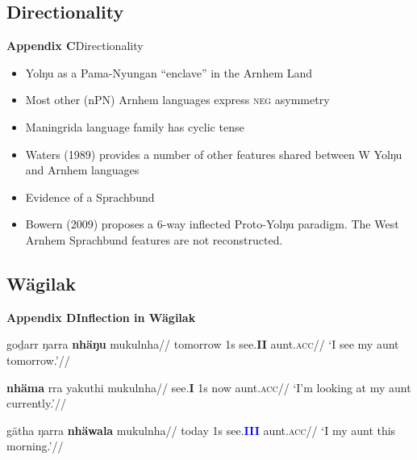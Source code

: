 \documentclass[dvipsnames]{beamer}%
\newcommand{\I}{\textbf{\textcolor{forest}{I}}}
\newcommand{\II}{\textbf{\textcolor{ochre}{II}}}
\newcommand{\III}{\textbf{\textcolor{blue}{III}}}
\begin{document}
%		
%		
%		
%		

\subsection*{Directionality}
\begin{frame}{\textbf{Appendix C}\hfill Directionality}
\begin{itemize}
	\item Yolŋu as a Pama-Nyungan ``enclave'' in the Arnhem Land
	\item Most other (nPN) Arnhem languages express \textsc{neg} asymmetry
	\item Maningrida language family has cyclic tense
	\item Waters (1989) provides a number of other features shared between W Yolŋu and Arnhem languages
	\item Evidence of a Sprachbund
	\item Bowern (2009) proposes a 6-way inflected Proto-Yolŋu paradigm. The West Arnhem Sprachbund features are not reconstructed.\end{itemize}
\end{frame}





\subsection*{Wägilak}

\begin{frame}{\textbf{Appendix D\hfill Inflection in Wägilak}}
	
	\ex\begingl\gla {}goḏarr ŋarra \textbf<1>{nhäŋu} mukulnha//
	\glb tomorrow 1s see.\II{} aunt.\textsc{acc}//
	\glft`I  see my aunt tomorrow.'//\endgl\xe
	
	\ex\begingl\gla {}\textbf<1>{nhäma} rra yakuthi mukulnha//
	\glb see.\textbf{{\I}} 1s now aunt.\textsc{acc}//
	\glft`I'm  looking at my aunt currently.'//\endgl\xe
	
	
	\ex\begingl\gla {}gätha ŋarra \textbf<1>{nhäwala} mukulnha//
	\glb today 1s see.\textbf{\III} aunt.\textsc{acc}//
	\glft`I  my aunt this morning.'//\endgl
	\xe
\end{frame}
\end{document}
